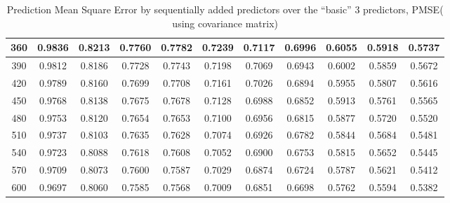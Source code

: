 \documentclass[12pt]{report}
\begin{document}
\begin{table}[h!]
{\begin{tabular}{||c c c c c c c c c c c||}
        360 & 0.9836 & 0.8213 & 0.7760 & 0.7782 & 0.7239 & 0.7117 & 0.6996 & 0.6055 & 0.5918 & 0.5737 \\ \hline
        390 & 0.9812 & 0.8186 & 0.7728 & 0.7743 & 0.7198 & 0.7069 & 0.6943 & 0.6002 & 0.5859 & 0.5672 \\ \hline
        420 & 0.9789 & 0.8160 & 0.7699 & 0.7708 & 0.7161 & 0.7026 & 0.6894 & 0.5955 & 0.5807 & 0.5616 \\ \hline
        450 & 0.9768 & 0.8138 & 0.7675 & 0.7678 & 0.7128 & 0.6988 & 0.6852 & 0.5913 & 0.5761 & 0.5565 \\ \hline
        480 & 0.9753 & 0.8120 & 0.7654 & 0.7653 & 0.7100 & 0.6956 & 0.6815 & 0.5877 & 0.5720 & 0.5520 \\ \hline
        510 & 0.9737 & 0.8103 & 0.7635 & 0.7628 & 0.7074 & 0.6926 & 0.6782 & 0.5844 & 0.5684 & 0.5481 \\ \hline
        540 & 0.9723 & 0.8088 & 0.7618 & 0.7608 & 0.7052 & 0.6900 & 0.6753 & 0.5815 & 0.5652 & 0.5445 \\ \hline
        570 & 0.9709 & 0.8073 & 0.7600 & 0.7587 & 0.7029 & 0.6874 & 0.6724 & 0.5787 & 0.5621 & 0.5412 \\ \hline
        600 & 0.9697 & 0.8060 & 0.7585 & 0.7568 & 0.7009 & 0.6851 & 0.6698 & 0.5762 & 0.5594 & 0.5382 \\ \hline
\end{tabular}}
\caption{Prediction Mean Square Error by sequentially added predictors over the “basic” 3 predictors, PMSE( using covariance matrix)}
\label{table:PMSEcov}
\end{table}
\end{document}

